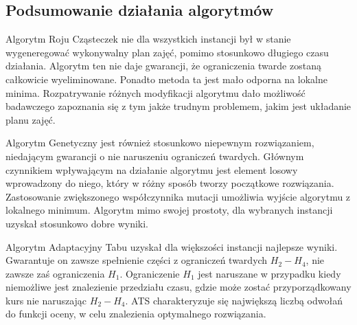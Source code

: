 \subsection{Podsumowanie działania algorytmów}
\par Algorytm Roju Cząsteczek nie dla wszystkich instancji był w stanie wygeneregować wykonywalny plan zajęć, pomimo stosunkowo długiego czasu działania. Algorytm ten nie daje gwarancji, że ograniczenia twarde zostaną całkowicie wyeliminowane. Ponadto metoda ta jest mało odporna na lokalne minima. Rozpatrywanie różnych modyfikacji algorytmu dało możliwość badawczego zapoznania się z tym jakże trudnym problemem, jakim jest układanie planu zajęć.
\par Algorytm Genetyczny jest również stosunkowo niepewnym rozwiązaniem, niedającym gwarancji o nie naruszeniu ograniczeń twardych. Głównym czynnikiem wpływającym na działanie algorytmu jest element losowy wprowadzony do niego, który w różny sposób tworzy początkowe rozwiązania. Zastosowanie zwiększonego współczynnika mutacji umożliwia wyjście algorytmu z lokalnego minimum. Algorytm mimo swojej prostoty, dla wybranych instancji uzyskał stosunkowo dobre wyniki.
\par Algorytm Adaptacyjny Tabu uzyskał dla większości instancji najlepsze wyniki. Gwarantuje on zawsze spełnienie części z ograniczeń twardych $H_{2}-H_{4}$, nie zawsze zaś ograniczenia $H_{1}$. Ograniczenie ${H_{1}}$ jest naruszane w przypadku kiedy niemożliwe jest znalezienie przedziału czasu, gdzie może zostać przyporządkowany kurs nie naruszając $H_{2}-H_{4}$. ATS charakteryzuje się największą liczbą odwołań do funkcji oceny, w celu znalezienia optymalnego rozwiązania.







